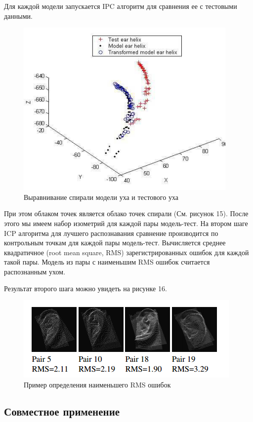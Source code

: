 \documentclass[12pt,a4paper]{article}					%
\begin{document}
Для каждой модели запускается IPC алгоритм для сравнения ее с тестовыми данными.


\begin{figure}[h!]
\centering
\includegraphics[scale=1.0]{res/icp_step_2}
\caption{Выравнивание спирали модели уха и тестового уха}
\end{figure}

При этом облаком точек является облако точек спирали (См. рисунок 15).
После этого мы имеем набор изометрий для каждой пары модель-тест.
На втором шаге ICP алгоритма для лучшего распознавания сравнение производится по контрольным точкам для каждой пары модель-тест.
Вычисляется среднее квадратичное (root mean square, RMS) зарегистрированных ошибок для каждой такой пары. 
Модель из пары с наименьшим RMS ошибок считается распознанным ухом.

Результат второго шага можно увидеть на рисунке 16.

\begin{figure}[h!]
\centering
\includegraphics[scale=1.0]{res/icp_step_3}
\caption{Пример определения наименьшего RMS ошибок}
\end{figure}


\subsection{Совместное применение}
\end{document}
